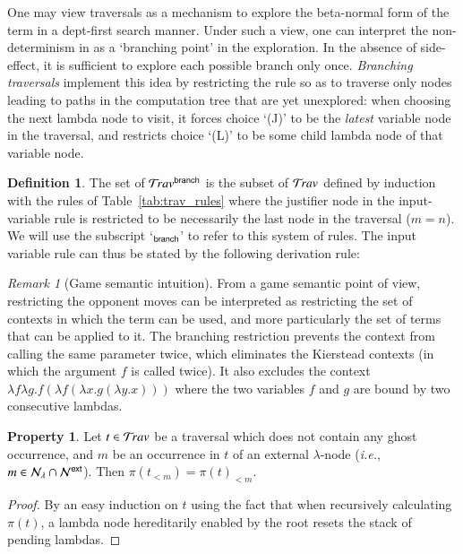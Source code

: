 \documentclass{elsarticle}
\makeatletter
\theoremstyle{plain}
\theoremstyle{definition}
\newtheorem{definition}{Definition}[section]
\newtheorem{property}{Property}[section]
\theoremstyle{remark}
\newtheorem{remark}{Remark}[section]
\newcommand\Nodes{\mathcal{N}}%
\newcommand\NodesVar{\Nodes_{\sf var}}%
\newcommand\NodesLmd{\Nodes_\lambda}%
\newcommand{\branching}{{\sf branch}}
\newcommand{\travsetbr}{{\travset^\branching}}
\newcommand{\travulc}{\travset}
\newcommand{\rulefont}[1]{\mathbf{\sf #1}}
\def\coresymbol{\pi} %
\newcommand{\core}[1]{\coresymbol(#1)} %
\newcommand{\enables}{\vdash} %
\newcommand{\ExtNodes}{\Nodes^{\sf ext}}
\renewcommand\ie{{\it i.e.\@\xspace}}
\makeatother
\begin{document}
One may view traversals as a mechanism to explore the beta-normal form of the term in a dept-first search manner. Under such a view, one can interpret the non-determinism in  as a `branching point' in the exploration. In the absence of side-effect, it is sufficient to explore each possible branch only once. \emph{Branching traversals} implement this idea by restricting the rule  so as to traverse only nodes leading to paths in the computation tree that are yet unexplored: when choosing the next lambda node to visit, it forces choice `(J)' to be the \emph{latest} variable node in the traversal, and restricts choice `(L)' to be some child lambda node of that variable node.

\begin{definition}
\label{dfn:branching_traversals}
The set of  $\travsetbr$ is the subset of $\travulc$ defined by induction with the rules of Table~\ref{tab:trav_rules} where the justifier node in the
input-variable rule  is restricted to be necessarily the last node in the traversal ($m=n$).
We will use the subscript `${}_\branching$' to refer to this system of rules. The input variable rule can thus be stated by the following derivation rule:
\infrule[$\rulefont{IVar_\branching}$]
     {t \cdot n \in\travsetbr
      \andalso n \in\ExtNodes\inter\NodesVar
      \andalso n \enables_i\alpha
      \andalso i \geq 1
     }
     { \in \travsetbr}
\end{definition}

\begin{remark}[Game semantic intuition]
From a game semantic point of view, restricting the opponent moves can be interpreted as restricting the set of contexts in which the term can be used, and more particularly the set of terms that can be applied to it.
The branching restriction prevents the context from calling the same parameter twice, which eliminates the Kierstead contexts (in which the argument $f$ is called twice). It also excludes the context $\lambda f \lambda g . f (\lambda f (\lambda x . g (\lambda y . x)))$ where the two variables $f$ and $g$ are bound by two consecutive lambdas.
\end{remark}

\begin{property}
\label{prop:core_truncation_at_externallambda}
Let $t\in\travulc$ be a traversal which does not contain any ghost occurrence, and $m$ be an occurrence in $t$ of an external $\lambda$-node (\ie, $m \in \NodesLmd\inter\ExtNodes$). Then $\core{t_{<m}} = \core{t}_{<m}$.
\end{property}
\begin{proof}
By an easy induction on $t$ using the fact that when recursively calculating $\coresymbol(t)$, a lambda node hereditarily enabled by the root resets the stack of pending lambdas.
\end{proof}
\end{document}
